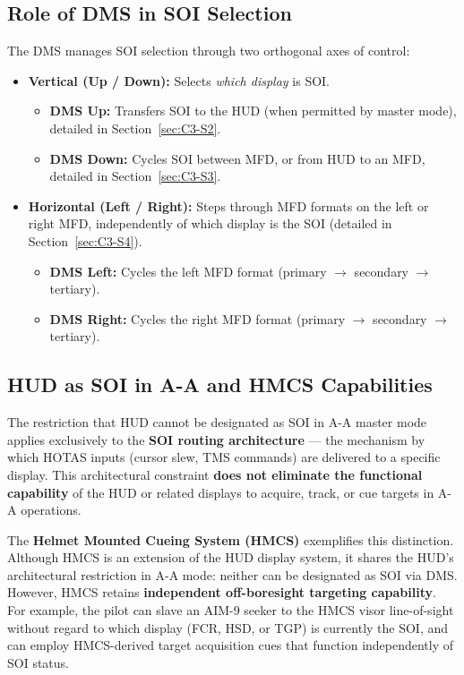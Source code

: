 \documentclass[11pt, a4paper, twoside]{report}
\begin{document}
\subsection{Role of DMS in SOI Selection}
\label{sec:C3-S1-S2}

The DMS manages SOI selection through two orthogonal axes of control:

\begin{itemize}
	\item \textbf{Vertical (Up / Down):} Selects \textit{which display} is SOI.
	\begin{itemize}
		\item \textbf{DMS Up:} Transfers SOI to the HUD (when permitted by master mode), detailed in Section~\ref{sec:C3-S2}.
		\item \textbf{DMS Down:} Cycles SOI between MFD, or from HUD to an MFD, detailed in Section~\ref{sec:C3-S3}.
	\end{itemize}
	\item \textbf{Horizontal (Left / Right):} Steps through MFD formats on the left or right MFD, independently of which display is the SOI (detailed in Section~\ref{sec:C3-S4}).
	\begin{itemize}
		\item \textbf{DMS Left:} Cycles the left MFD format (primary $\to$ secondary $\to$ tertiary).
		\item \textbf{DMS Right:} Cycles the right MFD format (primary $\to$ secondary $\to$ tertiary).
	\end{itemize}
\end{itemize}

\subsection{HUD as SOI in A-A and HMCS Capabilities}
\label{sec:C3-S1-S3}

The restriction that HUD cannot be designated as SOI in A-A master mode applies exclusively to the \textbf{SOI routing architecture} — the mechanism by which HOTAS inputs (cursor slew, TMS commands) are delivered to a specific display. This architectural constraint \textbf{does not eliminate the functional capability} of the HUD or related displays to acquire, track, or cue targets in A-A operations.

The \textbf{Helmet Mounted Cueing System (HMCS)} exemplifies this distinction. Although HMCS is an extension of the HUD display system, it shares the HUD's 
architectural restriction in A-A mode: neither can be designated as SOI via DMS. However, HMCS retains \textbf{independent off-boresight targeting capability}. For example, the pilot can slave an AIM-9 seeker to the HMCS visor line-of-sight without regard to which display (FCR, HSD, or TGP) is currently the SOI, and can employ HMCS-derived target acquisition cues that function independently of SOI status.
\end{document}
